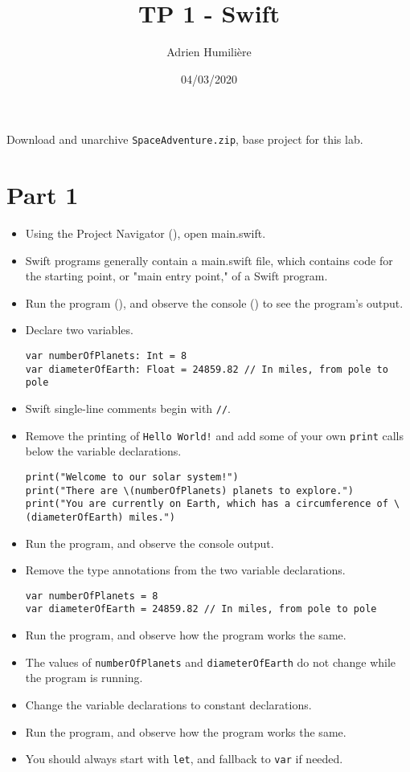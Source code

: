 \documentclass[a4paper,11pt]{scrartcl}
\begin{document}
\newcommand{\mytitle}{\textsf{\textbf{TP 1 - Swift}}}
\title{\mytitle}
\author{Adrien Humilière}
\date{04/03/2020}

\maketitle

Download and unarchive \texttt{SpaceAdventure.zip}, base project for this lab.

\section*{Part 1}

\begin{itemize}
\item Using the Project Navigator (), open main.swift.
\item Swift programs generally contain a main.swift file, which contains code for the starting point, or "main entry point," of a Swift program.
\item Run the program (), and observe the console () to see the program's output.
\item Declare two variables.
\begin{lstlisting}
var numberOfPlanets: Int = 8
var diameterOfEarth: Float = 24859.82 // In miles, from pole to pole
\end{lstlisting}
\item Swift single-line comments begin with \texttt{//}.
\item Remove the printing of \texttt{Hello World!} and add some of your own \texttt{print} calls below the variable declarations.
\begin{lstlisting}
print("Welcome to our solar system!")
print("There are \(numberOfPlanets) planets to explore.")
print("You are currently on Earth, which has a circumference of \(diameterOfEarth) miles.")
\end{lstlisting}
\item Run the program, and observe the console output.
\item Remove the type annotations from the two variable declarations.
\begin{lstlisting}
var numberOfPlanets = 8
var diameterOfEarth = 24859.82 // In miles, from pole to pole
\end{lstlisting}
\item Run the program, and observe how the program works the same.
\item The values of \texttt{numberOfPlanets} and \texttt{diameterOfEarth} do not change while the program is running.
\item Change the variable declarations to constant declarations.
\item Run the program, and observe how the program works the same.
\item You should always start with \texttt{let}, and fallback to \texttt{var} if needed.
\end{itemize}
\end{document}

